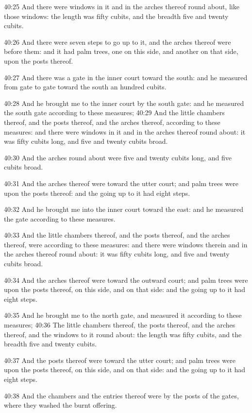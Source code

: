 40:25 And there were windows in it and in the arches thereof round
about, like those windows: the length was fifty cubits, and the
breadth five and twenty cubits.

40:26 And there were seven steps to go up to it, and the arches
thereof were before them: and it had palm trees, one on this side, and
another on that side, upon the posts thereof.

40:27 And there was a gate in the inner court toward the south: and he
measured from gate to gate toward the south an hundred cubits.

40:28 And he brought me to the inner court by the south gate: and he
measured the south gate according to these measures; 40:29 And the
little chambers thereof, and the posts thereof, and the arches
thereof, according to these measures: and there were windows in it and
in the arches thereof round about: it was fifty cubits long, and five
and twenty cubits broad.

40:30 And the arches round about were five and twenty cubits long, and
five cubits broad.

40:31 And the arches thereof were toward the utter court; and palm
trees were upon the posts thereof: and the going up to it had eight
steps.

40:32 And he brought me into the inner court toward the east: and he
measured the gate according to these measures.

40:33 And the little chambers thereof, and the posts thereof, and the
arches thereof, were according to these measures: and there were
windows therein and in the arches thereof round about: it was fifty
cubits long, and five and twenty cubits broad.

40:34 And the arches thereof were toward the outward court; and palm
trees were upon the posts thereof, on this side, and on that side: and
the going up to it had eight steps.

40:35 And he brought me to the north gate, and measured it according
to these measures; 40:36 The little chambers thereof, the posts
thereof, and the arches thereof, and the windows to it round about:
the length was fifty cubits, and the breadth five and twenty cubits.

40:37 And the posts thereof were toward the utter court; and palm
trees were upon the posts thereof, on this side, and on that side: and
the going up to it had eight steps.

40:38 And the chambers and the entries thereof were by the posts of
the gates, where they washed the burnt offering.

